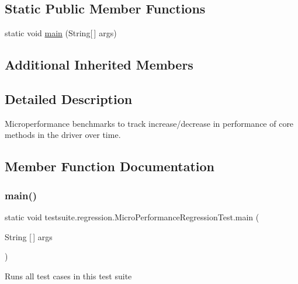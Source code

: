 \subsection*{Static Public Member Functions}
\begin{DoxyCompactItemize}
\item 
static void \mbox{\hyperlink{classtestsuite_1_1regression_1_1_micro_performance_regression_test_add1a6e74f7b15be05664993e779b93c4}{main}} (String\mbox{[}$\,$\mbox{]} args)
\end{DoxyCompactItemize}
\subsection*{Additional Inherited Members}


\subsection{Detailed Description}
Microperformance benchmarks to track increase/decrease in performance of core methods in the driver over time. 

\subsection{Member Function Documentation}
\mbox{\label{classtestsuite_1_1regression_1_1_micro_performance_regression_test_add1a6e74f7b15be05664993e779b93c4}} 
\subsubsection{\texorpdfstring{main()}{main()}}
{\footnotesize\ttfamily static void testsuite.\+regression.\+Micro\+Performance\+Regression\+Test.\+main (\begin{DoxyParamCaption}\item[{String \mbox{[}$\,$\mbox{]}}]{args }\end{DoxyParamCaption})\hspace{0.3cm}{\ttfamily [static]}}

Runs all test cases in this test suite


